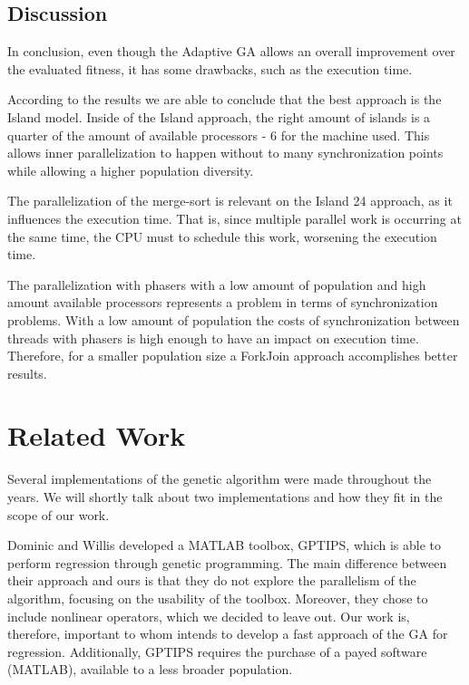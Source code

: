 \documentclass[runningheads]{llncs}
\begin{document}
\subsection{Discussion}

In conclusion, even though the Adaptive GA allows an overall improvement over the evaluated fitness, it has some drawbacks, such as the execution time.

According to the results we are able to conclude that the best approach is the Island model. Inside of the Island approach, the right amount of islands is a quarter of the amount of available processors - 6 for the machine used. This allows inner parallelization to happen without to many synchronization points while allowing a higher population diversity.

The parallelization of the merge-sort is relevant on the Island 24 approach, as it influences the execution time. That is, since multiple parallel work is occurring at the same time, the CPU must to schedule this work, worsening the execution time.

The parallelization with phasers with a low amount of population and high amount available processors represents a problem in terms of synchronization problems. With a low amount of population the costs of synchronization between threads with phasers is high enough to have an impact on execution time. Therefore, for a smaller population size a ForkJoin approach accomplishes better results.

\section{Related Work}

Several implementations of the genetic algorithm were made throughout the years. We will shortly talk about two implementations and how they fit in the scope of our work.

Dominic and Willis  \cite{GPTIPS} developed a MATLAB toolbox, GPTIPS, which is able to perform regression through genetic programming. The main difference between their approach and ours is that they do not explore the parallelism of the algorithm, focusing on the usability of the toolbox. Moreover, they chose to include nonlinear operators, which we decided to leave out. Our work is, therefore, important to whom intends to develop a fast approach of the GA for regression. Additionally, GPTIPS requires the purchase of a payed software (MATLAB), available to a less broader population.
\end{document}
